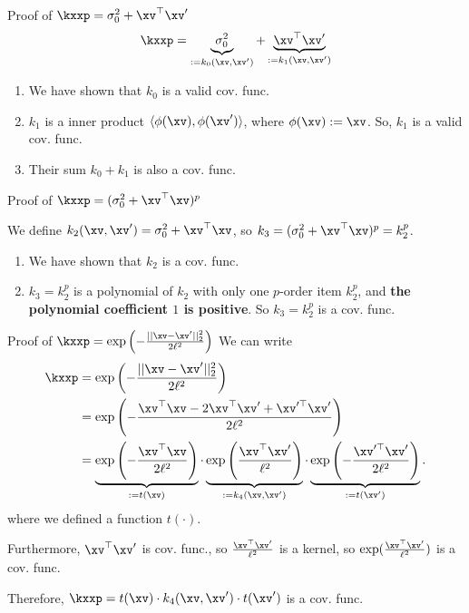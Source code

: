 \documentclass[aspectratio=169]{beamer}
\newcommand{\xvp}{\xv^\prime}
\begin{document}
\begin{frame}{Proof of $\kxxp = \sigma_0^2 + \xv^\top \xvp$}
	\begin{align*}
		\kxxp = \underbrace{\sigma_0^2}_{:= k_0(\xv, \xvp)} + \underbrace{\xv^\top \xvp}_{:= k_1(\xv, \xvp)}
	\end{align*}
	\begin{enumerate}
		\item We have shown that $k_0$ is a valid cov. func.
		\item $k_1$ is a inner product $\langle \phi(\xv), \phi(\xvp) \rangle$, where $\phi(\xv) := \xv$. So, $k_1$ is a valid cov. func.
		\item Their sum $k_0 + k_1$ is also a cov. func.
	\end{enumerate}
\end{frame}

\begin{frame}{Proof of $\kxxp = (\sigma_0^2 + \xv^\top \xv)^p$}
	
	We define $k_2(\xv, \xvp) =\sigma_0^2 + \xv^\top \xv$, so $k_3 = (\sigma_0^2 + \xv^\top \xv)^p = k_2^p$.
	
	\begin{enumerate}
		\item We have shown that $k_2$ is a cov. func.
		\item $k_3 = k_2^p$ is a polynomial of $k_2$ with only one $p$-order item $k_2^p$, and \textbf{the polynomial coefficient $1$ is positive}. So $k_3 = k_2^p$ is a cov. func.
	\end{enumerate}
\end{frame}

\begin{frame}{Proof of $\kxxp = \exp\left(- \frac{||\xv - \xvp||_2^2}{2 \ell^2}\right)$}
\small
	We can write
	\begin{align*}
		\kxxp &= \exp\left(- \frac{||\xv - \xvp||_2^2}{2 \ell^2}\right) \\
		&=\exp \left( - \frac{\xv^\top \xv - 2 \xv^\top \xvp + \xv^{\prime \top} \xvp}{2 \ell^2} \right) \\
		&= \underbrace{\exp \left(-\frac{\xv^\top \xv}{2 \ell^2} \right)}_{:= t(\xv)}\cdot 
		\underbrace{\exp \left(\frac{\xv^\top \xvp}{\ell^2} \right)}_{:=k_4(\xv, \xvp)} \cdot \underbrace{\exp \left( - \frac{\xv^{\prime \top} \xvp}{2 \ell^2} \right)}_{:= t(\xvp)}.\\ 
	\end{align*}
	where we defined a function $t(\cdot)$.
	
	Furthermore, $\xv^\top \xvp$ is cov. func., so $\frac{\xv^\top \xvp}{\ell^2}$ is a kernel, so $\exp(\frac{\xv^\top \xvp}{\ell^2})$ is a cov. func. 
	
	Therefore, $\kxxp = t(\xv) \cdot k_4(\xv, \xvp) \cdot t(\xvp)$ is a cov. func.
\end{frame}
\end{document}

